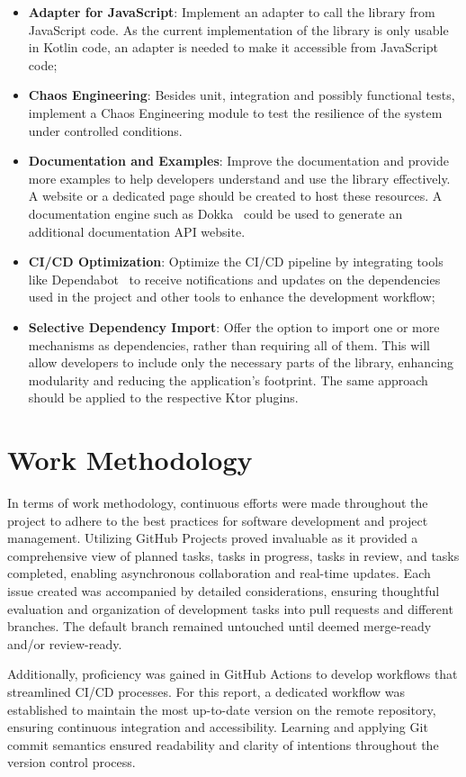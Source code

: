\begin{itemize}
    \item \textbf{Adapter for JavaScript}: Implement an adapter to call the library from JavaScript code.
    As the current implementation of the library is only usable in Kotlin code, an adapter is needed to make it accessible from JavaScript code;
    \item \textbf{Chaos Engineering}: Besides unit, integration and possibly functional tests, implement a Chaos Engineering module to test the resilience of the system under controlled conditions.
    \item \textbf{Documentation and Examples}:
    Improve the documentation
    and provide more examples to help developers understand and use the library effectively.
    A website or a dedicated page should be created
    to host these resources.
    A documentation engine such as Dokka~\cite{dokka} could be used to generate an additional documentation API website.
    \item \textbf{CI/CD Optimization}:
    Optimize the CI/CD pipeline by integrating tools like Dependabot~\cite{github-dependabot} to receive notifications and updates on the dependencies used in the project and other tools to enhance the development workflow;
    \item \textbf{Selective Dependency Import}:
    Offer the option to import one or more mechanisms as dependencies, rather than requiring all of them.
    This will allow developers to include only the necessary parts of the library, enhancing modularity and reducing the application's footprint.
    The same approach should be applied to the respective Ktor plugins.
\end{itemize}


\section{Work Methodology}\label{sec:work-methodology}

In terms of work methodology, continuous efforts were made throughout the project to adhere to the best practices for software development and project management.
Utilizing GitHub Projects proved invaluable as it provided a comprehensive view of planned tasks,
tasks in progress, tasks in review, and tasks completed, enabling asynchronous collaboration and real-time updates.
Each issue created was accompanied by detailed considerations,
ensuring thoughtful evaluation and organization of development tasks into pull requests and different branches.
The default branch remained untouched until deemed merge-ready and/or review-ready.

Additionally, proficiency was gained in GitHub Actions to develop workflows that streamlined CI/CD processes.
For this report, a dedicated workflow was established to maintain the most up-to-date version on the remote repository,
ensuring continuous integration and accessibility.
Learning and applying Git commit semantics ensured readability and clarity of intentions throughout the version control process.
